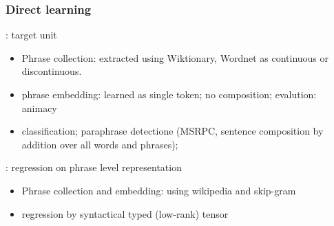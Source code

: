 \documentclass{article} %
\begin{document}
\subsubsection{Direct learning}
\cite{yin2014exploration}: target unit
\begin{itemize}
	\item Phrase collection: extracted using Wiktionary,
		Wordnet as continuous or discontinuous.
	\item phrase embedding: learned as single token; no
		composition;
evalution: animacy
	\item classification; paraphrase detectione (MSRPC, sentence composition
	by addition over all words and phrases);
\end{itemize}


\cite{zhao2015phrase}: regression on phrase level representation
\begin{itemize}
\item Phrase collection and embedding: using wikipedia and skip-gram
\item regression by syntactical typed (low-rank) tensor
\end{itemize}
\end{document}
